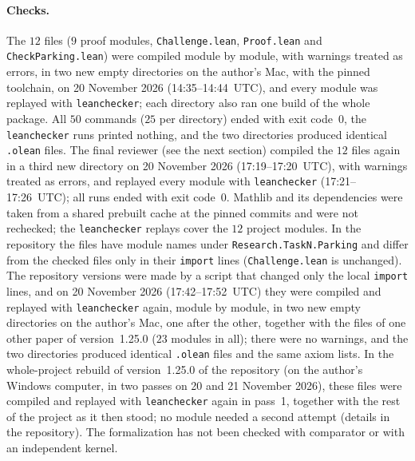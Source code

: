 \documentclass[11pt]{article}
\theoremstyle{remark}
\newcommand{\repoversion}{1.25.0}
\begin{document}
{\paragraph{Checks.}
The $12$ files ($9$ proof modules, \texttt{Challenge.lean},
\texttt{Proof.lean} and \texttt{CheckParking.lean}) were compiled module by
module, with warnings treated as errors, in two new empty directories on the
author's Mac, with the pinned toolchain, on 20 November 2026
(14:35--14:44~UTC), and every module was replayed with \texttt{leanchecker};
each directory also ran one build of the whole package. All $50$ commands
($25$ per directory) ended with exit code~$0$, the \texttt{leanchecker} runs
printed nothing, and the two directories produced identical \texttt{.olean}
files. The final reviewer (see the next section) compiled the $12$ files again
in a third new directory on 20 November 2026 (17:19--17:20~UTC), with warnings
treated as errors, and replayed every module with \texttt{leanchecker}
(17:21--17:26~UTC); all runs ended with exit code~$0$. Mathlib and its
dependencies were taken from a shared prebuilt cache at the pinned commits and
were not rechecked; the \texttt{leanchecker} replays cover the $12$ project
modules. In the repository the files have module names under
\texttt{Research.TaskN.Parking} and differ from the checked files only in
their \texttt{import} lines (\texttt{Challenge.lean} is unchanged).
The repository versions were made by a script that changed only the local \texttt{import} lines, and on 20 November 2026 (17:42--17:52~UTC) they were compiled and replayed with \texttt{leanchecker} again, module by module, in two new empty directories on the author's Mac, one after the other, together with the files of one other paper of version~\repoversion{} ($23$ modules in all); there were no warnings, and the two directories produced identical \texttt{.olean} files and the same axiom lists. In the whole-project rebuild of version~\repoversion{} of the repository (on the author's Windows computer, in two passes on 20 and 21 November 2026), these files were compiled and replayed with \texttt{leanchecker} again in pass~1, together with the rest of the project as it then stood; no module needed a second attempt (details in the repository). The formalization has not been checked with
comparator or with an independent kernel.

\par}
\end{document}
